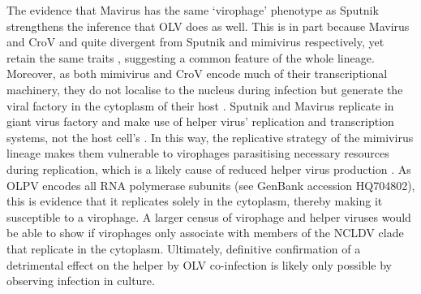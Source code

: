 The evidence that Mavirus has the same `virophage' phenotype as Sputnik strengthens the inference that \ac{OLV} does as well.
This is in part because Mavirus and \ac{CroV} and quite divergent from Sputnik and mimivirus respectively, yet retain the same traits \cite{Fischer2010, Fischer2011a}, suggesting a common feature of the whole lineage.
Moreover, as both mimivirus and \ac{CroV} encode much of their transcriptional machinery, they do not localise to the nucleus during infection but generate the viral factory in the cytoplasm of their host \cite{LaScola2008, Fischer2011a}.
Sputnik and Mavirus replicate in giant virus factory and make use of helper virus' replication and transcription systems, not the host cell's \cite{LaScola2008, Claverie2009, Fischer2011a}.
In this way, the replicative strategy of the mimivirus lineage makes them vulnerable to virophages parasitising necessary resources during replication, which is a likely cause of reduced helper virus production \cite{Claverie2009, Fischer2011a, Fischer2011b}.
As \ac{OLPV} encodes all \textsc{RNA} polymerase subunits (see GenBank accession HQ704802), this is evidence that it replicates solely in the cytoplasm, thereby making it susceptible to a virophage.
A larger census of virophage and helper viruses would be able to show if virophages only associate with members of the \ac{NCLDV} clade that replicate in the cytoplasm.
Ultimately, definitive confirmation of a detrimental effect on the helper by \ac{OLV} co-infection is likely only possible by observing infection in culture.

